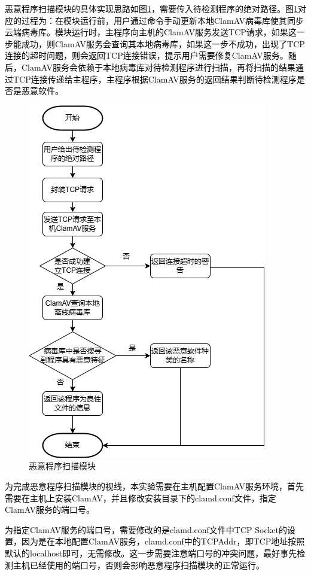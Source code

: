 \textcolor{black}{恶意程序扫描模块的具体实现思路如图\ref{fig:malware_scan_module}，需要传入待检测程序的绝对路径。图\ref{fig:malware_scan_module}对应的过程为：在模块运行前，用户通过命令手动更新本地ClamAV病毒库使其同步云端病毒库。模块运行时，主程序向主机的ClamAV服务发送TCP请求，如果这一步能成功，则ClamAV服务会查询其本地病毒库，如果这一步不成功，出现了TCP连接的超时问题，则会返回TCP连接错误，提示用户需要修复ClamAV服务。随后，ClamAV服务会依赖于本地病毒库对待检测程序进行扫描，再将扫描的结果通过TCP连接传递给主程序，主程序根据ClamAV服务的返回结果判断待检测程序是否是恶意软件。}

\begin{figure}[htbp]
  \centering
  \includegraphics[]{images/malware_scan_module.png}
  \caption{恶意程序扫描模块}\label{fig:malware_scan_module}
\end{figure}

\textcolor{black}{为完成恶意程序扫描模块的视线，本实验需要在主机配置ClamAV服务环境，首先需要在主机上安装ClamAV，并且修改安装目录下的clamd.conf文件，指定ClamAV服务的端口号。}

\textcolor{black}{为指定ClamAV服务的端口号，需要修改的是clamd.conf文件中TCP Socket的设置，因为是在本地配置ClamAV服务，clamd.conf中的TCPAddr，即TCP地址按照默认的localhost即可，无需修改。这一步需要注意端口号的冲突问题，最好事先检测主机已经使用的端口号，否则会影响恶意程序扫描模块的正常运行。}


